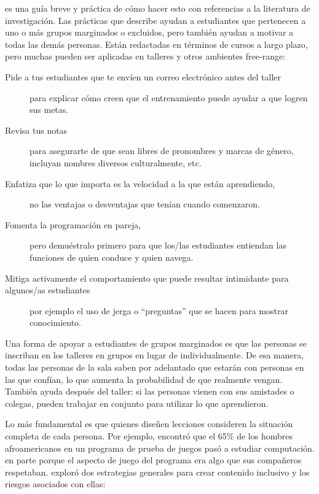 \cite{Lee2017} es una guía breve y práctica de cómo hacer esto con referencias a la literatura de investigación.
Las prácticas que describe ayudan a estudiantes que pertenecen a uno o más grupos marginados o excluidos,
pero también ayudan a motivar a todas las demás personas.
Están redactadas en términos de cursos a largo plazo,
pero muchas pueden ser aplicadas en talleres y otros ambientes free-range:

\begin{description}

\item[Pide a tus estudiantes que te envíen un correo electrónico antes del taller]
  para explicar cómo creen que el entrenamiento puede ayudar a que logren sus metas.

\item[Revisa tus notas]
  para asegurarte de que sean libres de pronombres y marcas de género, incluyan nombres diversos culturalmente, etc.

\item[Enfatiza que lo que importa es la velocidad a la que están aprendiendo,]
  no las ventajas o desventajas que tenían cuando comenzaron.

\item[Fomenta la programación en pareja,]
  pero demuéstralo primero para que los/las estudiantes entiendan las funciones de quien conduce y quien navega.

\item[Mitiga activamente el comportamiento que puede resultar intimidante para algunos/as estudiantes]
  por ejemplo el uso de jerga o ``preguntas'' que se hacen para mostrar conocimiento.

\end{description}

Una forma de apoyar a estudiantes de grupos marginados es
que las personas se inscriban en los talleres en grupos en lugar de individualmente.
De esa manera,
todas las personas de la sala saben por adelantado que estarán con personas en las que confían,
lo que aumenta la probabilidad de que realmente vengan.
También ayuda después del taller:
si las personas vienen con sus amistades o colegas,
pueden trabajar en conjunto para utilizar lo que aprendieron.

Lo más fundamental es que quienes diseñen lecciones
consideren la situación completa de cada persona.
Por ejemplo,
\cite{DiSa2014a} encontró que el 65\% de los hombres afroamericanos en un programa de prueba de juegos pasó a estudiar computación.
en parte porque el aspecto de juego del programa era algo que sus compañeros respetaban.
\cite{Lach2018} exploró dos estrategias generales para crear contenido inclusivo y los riesgos asociados con ellas:

